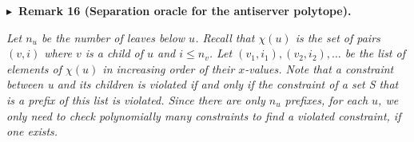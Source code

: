\documentclass[10pt,a4paper]{article}
\begin{document}




\par\medskip\noindent\textbf{
$\blacktriangleright$ Remark 16 (Separation oracle for the antiserver polytope).
}\par



\emph{Let $n_{u}$ be the number of leaves below $u$. Recall that $\chi(u)$ is the set of pairs $(v,i)$ where $v$ is a child of $u$ and $i\leq n_{v}$. Let $(v_{1},i_{1}),(v_{2},i_{2}),\dots$ be the list of elements of $\chi(u)$ in increasing order of their $x$-values. Note that a constraint between u and its children is violated if and only if the constraint of a set S that is a prefix of this list is violated. Since there are only $n_{u}$ prefixes, for each $u$, we only need to check polynomially many constraints to find a violated constraint, if one exists.}\par






\par
\end{document}
